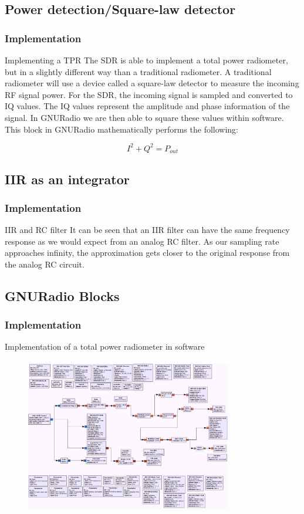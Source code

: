 \documentclass{beamer}
\begin{document}
\subsection{Power detection/Square-law detector}
\begin{frame}
\frametitle{Implementation}
\begin{block}{Implementing a TPR}
The SDR is able to implement a total power radiometer, but in a slightly different way than a traditional radiometer.  A traditional radiometer will use a device called a square-law detector to measure the incoming RF signal power.  For the SDR, the incoming signal is sampled and converted to IQ values.  The IQ values represent the amplitude and phase information of the signal.  In GNURadio we are then able to square these values within software.  This block in GNURadio mathematically performs the following:

\begin{equation}\label{sumIQ}
I^2+Q^2 = P_{out}
\end{equation}
\end{block}
\end{frame}
\subsection{IIR as an integrator}
\begin{frame}
\frametitle{Implementation}
\begin{block}{IIR and RC filter}
It can be seen that an IIR filter can have the same frequency response as we would expect from an analog RC filter.  As our sampling rate approaches infinity, the approximation gets closer to the original response from the analog RC circuit.  
\end{block}
\end{frame}

\subsection{GNURadio Blocks}
\begin{frame}
\frametitle{Implementation}

Implementation of a total power radiometer in software 

\begin{figure}\label{GNURadio_Block}
\includegraphics[width=9cm]{images/GNURadio_Block_tpr.png}
\end{figure}

\end{frame}
\end{document}
